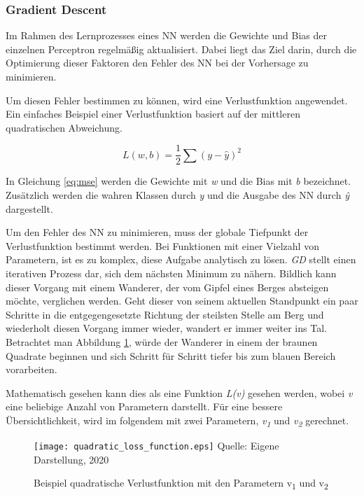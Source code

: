 \subsubsection{Gradient Descent}
Im Rahmen des Lernprozesses eines \ac{NN} werden die Gewichte und Bias der einzelnen Perceptron regelmäßig aktualisiert. Dabei liegt das Ziel darin, durch die Optimierung dieser Faktoren den Fehler des \ac{NN} bei der Vorhersage zu minimieren.

Um diesen Fehler bestimmen zu können, wird eine Verlustfunktion angewendet. Ein einfaches Beispiel einer Verlustfunktion basiert auf der mittleren quadratischen Abweichung.

\begin{equation} \label{eq:mse}
    L(w,b) = \frac{1}{2} \sum (y-\hat{y})^2
\end{equation}

In Gleichung \ref{eq:mse} werden die Gewichte mit \textit{w} und die Bias mit \textit{b} bezeichnet. Zusätzlich werden die wahren Klassen durch \textit{y} und die Ausgabe des \ac{NN} durch \textit{\^{y}} dargestellt. 


Um den Fehler des \ac{NN} zu minimieren, muss der globale Tiefpunkt der Verlustfunktion bestimmt werden. Bei Funktionen mit einer Vielzahl von Parametern, ist es zu komplex, diese Aufgabe analytisch zu lösen. \textit{\ac{GD}} stellt einen iterativen Prozess dar, sich dem nächsten Minimum zu nähern. Bildlich kann dieser Vorgang mit einem Wanderer, der vom Gipfel eines Berges absteigen möchte, verglichen werden. Geht dieser von seinem aktuellen Standpunkt ein paar Schritte in die entgegengesetzte Richtung der steilsten Stelle am Berg und wiederholt diesen Vorgang immer wieder, wandert er immer weiter ins Tal. Betrachtet man Abbildung \ref{fig:quadLoss}, würde der Wanderer in einem der braunen Quadrate beginnen und sich Schritt für Schritt tiefer bis zum blauen Bereich vorarbeiten. 

Mathematisch gesehen kann dies als eine Funktion \textit{L(v)} gesehen werden, wobei \textit{v} eine beliebige Anzahl von Parametern darstellt. Für eine bessere Übersichtlichkeit, wird im folgendem mit zwei Parametern, \textit{v\textsubscript{1}} und \textit{v\textsubscript{2}} gerechnet.

\begin{figure}[H]
    \centering
    \caption[]{Beispiel quadratische Verlustfunktion mit den Parametern v\textsubscript{1} und v\textsubscript{2}}
	\label{fig:quadLoss}
    \texttt{[image: quadratic\_loss\_function.eps]}
    Quelle: Eigene Darstellung, 2020
\end{figure}

